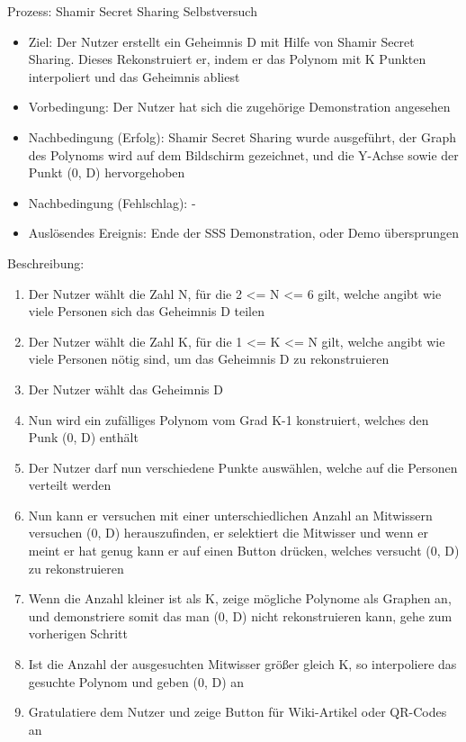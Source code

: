 \documentclass{article}
\begin{document}
\begin{FA}[start=1000]
\item Prozess: Shamir Secret Sharing Selbstversuch
\end{FA}
\begin{itemize}[label={}]
    \item Ziel: Der Nutzer erstellt ein Geheimnis D
        mit Hilfe von Shamir Secret Sharing.
        Dieses Rekonstruiert er, indem er das Polynom
        mit K Punkten interpoliert und das Geheimnis
        abliest
    \item Vorbedingung: Der Nutzer hat sich die zugehörige
        Demonstration angesehen
    \item Nachbedingung (Erfolg): Shamir Secret Sharing wurde
        ausgeführt, der Graph des Polynoms wird auf dem
        Bildschirm gezeichnet, und die Y-Achse
        sowie der Punkt (0, D) hervorgehoben
    \item Nachbedingung (Fehlschlag): -
    \item Auslösendes Ereignis: Ende der SSS Demonstration,
        oder Demo übersprungen
\end{itemize}

Beschreibung:
\begin{enumerate}
    \item Der Nutzer wählt die Zahl N,
        für die 2 <= N <= 6 gilt, welche
        angibt wie viele Personen sich das
        Geheimnis D teilen
    \item Der Nutzer wählt die Zahl K,
        für die 1 <= K <= N gilt, welche
        angibt wie viele Personen nötig
        sind, um das Geheimnis D zu
        rekonstruieren
    \item Der Nutzer wählt das Geheimnis D
    \item Nun wird ein zufälliges Polynom
        vom Grad K-1 konstruiert, welches
        den Punk (0, D) enthält
    \item Der Nutzer darf nun verschiedene
        Punkte auswählen, welche auf
        die Personen verteilt werden
    \item Nun kann er versuchen mit
        einer unterschiedlichen Anzahl
        an Mitwissern versuchen (0, D)
        herauszufinden, er selektiert
        die Mitwisser und wenn er meint
        er hat genug kann er auf
        einen Button drücken, welches
        versucht (0, D) zu rekonstruieren
    \item Wenn die Anzahl kleiner ist als
        K, zeige mögliche Polynome als
        Graphen an, und demonstriere somit
        das man (0, D) nicht rekonstruieren
        kann, gehe zum vorherigen Schritt
    \item Ist die Anzahl der ausgesuchten
        Mitwisser größer gleich K, so
        interpoliere das gesuchte Polynom
        und geben (0, D) an
    \item Gratulatiere dem Nutzer und
        zeige Button für Wiki-Artikel
        oder QR-Codes an
\end{enumerate}
\end{document}
